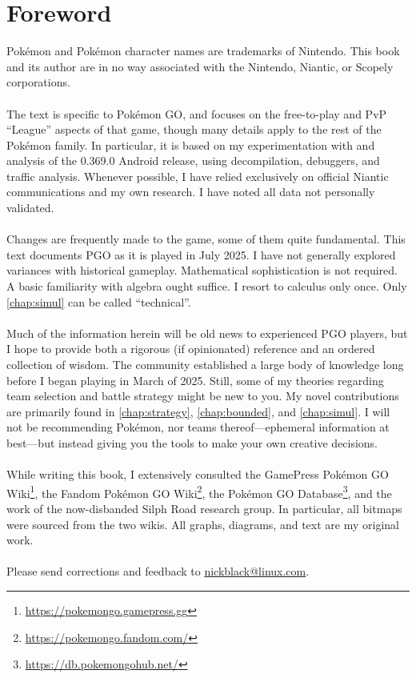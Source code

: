 \clearpage
\chapter{Foreword}

\noindent{}Pokémon and Pokémon character names are trademarks of Nintendo.
This book and its author are in no way associated with the Nintendo, Niantic,
  or Scopely corporations.\\
\\
\noindent{}The text is specific to Pokémon GO, and focuses on the free-to-play and PvP
  ``League'' aspects of that game, though many details
  apply to the rest of the Pokémon family.
In particular, it is based on my experimentation with and analysis of
 the 0.369.0 Android release, using decompilation, debuggers, and
 traffic analysis.
Whenever possible, I have relied exclusively on official Niantic communications
 and my own research.
I have noted all data not personally validated.\\
\\
\noindent{}Changes are frequently made to the game, some of them quite fundamental.
This text documents PGO as it is played in July 2025.
I have not generally explored variances with historical gameplay.
Mathematical sophistication is not required.
A basic familiarity with algebra ought suffice.
I resort to calculus only once.
Only \autoref{chap:simul} can be called ``technical''.\\
\\
\noindent{}Much of the information herein will be old news to experienced
 PGO players, but I hope to provide both a rigorous (if opinionated) reference and an ordered collection of wisdom.
The community established a large body of knowledge long before I
 began playing in March of 2025.
Still, some of my theories regarding team selection and battle strategy might
  be new to you.
My novel contributions are primarily found in \autoref{chap:strategy},
  \autoref{chap:bounded}, and \autoref{chap:simul}.
I will not be recommending Pokémon, nor teams thereof---ephemeral information at best---but
 instead giving you the tools to make your own creative decisions.\\
\\
\noindent{}While writing this book, I extensively consulted the
  GamePress Pokémon GO Wiki\footnote{\url{https://pokemongo.gamepress.gg}},
  the Fandom Pokémon GO Wiki\footnote{\url{https://pokemongo.fandom.com/}},
  the Pokémon GO Database\footnote{\url{https://db.pokemongohub.net/}},
  and the work of the now-disbanded Silph Road research group.
In particular, all bitmaps were sourced from the two wikis.
All graphs, diagrams, and text are my original work.\\
\\
\noindent{}Please send corrections and feedback to 
  \href{mailto:nickblack@linux.com}{nickblack@linux.com}.
